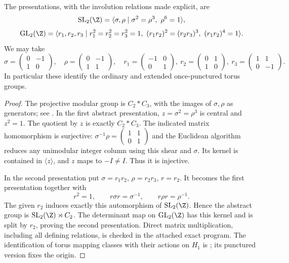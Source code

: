 \begin{theorem}\label{A6-matrix-presentations}
The presentations, with the involution relations made explicit, are
\[
 \operatorname{SL}_2(\Z)
 =\langle \sigma,\rho\mid \sigma^2=\rho^3,\ \rho^6=1\rangle,
\]
\[
 \operatorname{GL}_2(\Z)
 =\langle r_1,r_2,r_3\mid
 r_1^2=r_2^2=r_3^2=1,\
 (r_1r_2)^2=(r_2r_3)^3,\
 (r_1r_2)^4=1\rangle.
\]
We may take
\[
 \sigma=\begin{pmatrix}0&-1\\1&0\end{pmatrix},\quad
 \rho=\begin{pmatrix}0&-1\\1&1\end{pmatrix},\quad
 r_1=\begin{pmatrix}-1&0\\0&1\end{pmatrix},\
 r_2=\begin{pmatrix}0&1\\1&0\end{pmatrix},\
 r_3=\begin{pmatrix}1&1\\0&-1\end{pmatrix}.
\]
In particular these identify the ordinary and extended once-punctured torus groups.
\end{theorem}
\begin{proof}
The projective modular group is $C_2*C_3$, with the images of $\sigma,\rho$ as generators; see \cite[Appendix C, Theorem C.1]{ConradSL2A567}. In the first abstract presentation, $z=\sigma^2=\rho^3$ is central and $z^2=1$. The quotient by $z$ is exactly $C_2*C_3$. The indicated matrix homomorphism is surjective: $\sigma^{-1}\rho=\left(\begin{smallmatrix}1&1\\0&1\end{smallmatrix}\right)$ and the Euclidean algorithm reduces any unimodular integer column using this shear and $\sigma$. Its kernel is contained in $\langle z\rangle$, and $z$ maps to $-I\ne I$. Thus it is injective.

In the second presentation put $\sigma=r_1r_2$, $\rho=r_2r_3$, $r=r_2$. It becomes the first presentation together with
\[
 r^2=1,\qquad r\sigma r=\sigma^{-1},\qquad r\rho r=\rho^{-1}.
\]
The given $r_2$ induces exactly this automorphism of $\operatorname{SL}_2(\Z)$. Hence the abstract group is $\operatorname{SL}_2(\Z)\rtimes C_2$. The determinant map on $\operatorname{GL}_2(\Z)$ has this kernel and is split by $r_2$, proving the second presentation. Direct matrix multiplication, including all defining relations, is checked in the attached exact program. The identification of torus mapping classes with their actions on $H_1$ is \cite[Theorem 2.5 and \S2.2.4]{FarbMargalit2012A567}; its punctured version fixes the origin.
\end{proof}

